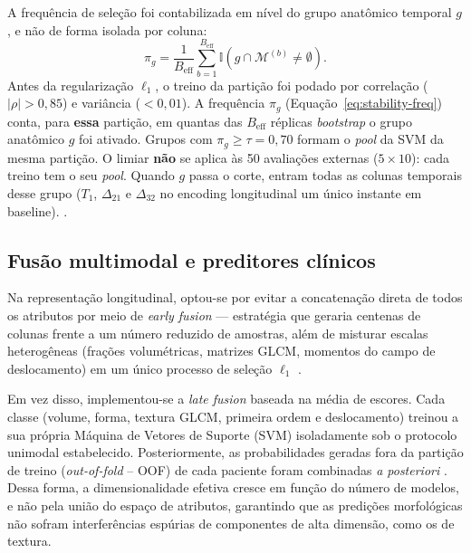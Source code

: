 \documentclass[review]{elsarticle}
\begin{document}
	A frequência de seleção foi contabilizada em nível do grupo anatômico temporal $g$, e não de forma isolada por coluna:
	\begin{equation}
		\pi_g = \frac{1}{B_{\mathrm{eff}}}\sum_{b=1}^{B_{\mathrm{eff}}} \mathbb{I}\!\left(g\cap\mathcal{M}^{(b)}\ne\emptyset\right).
		\label{eq:stability-freq}
	\end{equation}
	Antes da regularização \(\ell_1\), o treino da partição foi podado por correlação (\(|\rho|>0{,}85\)) e variância (\(<0{,}01\)). A frequência \(\pi_g\) (Equação~\ref{eq:stability-freq}) conta, para \textbf{essa} partição, em quantas das \(B_{\mathrm{eff}}\) réplicas \emph{bootstrap} o grupo anatômico \(g\) foi ativado. Grupos com \(\pi_g \ge \tau=0{,}70\) formam o \emph{pool} da SVM da mesma partição. O limiar \textbf{não} se aplica às 50 avaliações externas (\(5\times 10\)): cada treino tem o seu \emph{pool}. Quando \(g\) passa o corte, entram todas as colunas temporais desse grupo (\(T_1\), \(\Delta_{21}\) e \(\Delta_{32}\) no encoding longitudinal um único instante em baseline). .
	
	\subsection{Fusão multimodal e preditores clínicos}
	\label{sec:fusao}
	
	Na representação longitudinal, optou-se por evitar a concatenação direta de todos os atributos por meio de \textit{early fusion} — estratégia que geraria centenas de colunas frente a um número reduzido de amostras, além de misturar escalas heterogêneas (frações volumétricas, matrizes GLCM, momentos do campo de deslocamento) em um único processo de seleção $\ell_1$ \cite{kittler-1998,kuncheva-2004}.
	
	Em vez disso, implementou-se a \textit{late fusion} baseada na média de escores. Cada classe (volume, forma, textura GLCM, primeira ordem e deslocamento) treinou a sua própria Máquina de Vetores de Suporte (SVM) isoladamente sob o protocolo unimodal estabelecido. Posteriormente, as probabilidades geradas fora da partição de treino (\emph{out-of-fold} -- OOF) de cada paciente foram combinadas \emph{a posteriori} \cite{kittler-1998,dietterich-2000}. Dessa forma, a dimensionalidade efetiva cresce em função do número de modelos, e não pela união do espaço de atributos, garantindo que as predições morfológicas não sofram interferências espúrias de componentes de alta dimensão, como os de textura.
	
\end{document}
